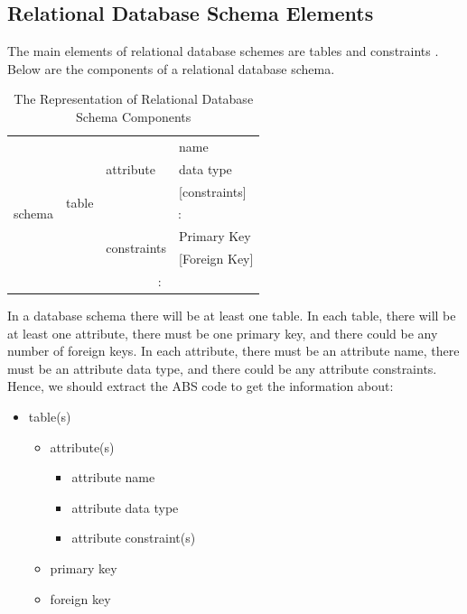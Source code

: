 \documentclass[runningheads,a4paper]{llncs}
\begin{document}
\subsection{Relational Database Schema Elements}
The main elements of relational database schemes are tables and constraints \cite{book2}. Below are the components of a relational database schema.

\begin{table}[]
	\centering
	\caption{ The Representation of Relational Database Schema Components}
	\label{my-label}
	\begin{tabular}{|l|l|l|l|}
		\hline
		\multirow{9}{*}{schema} & \multirow{7}{*}{table} & \multirow{3}{*}{attribute}   & name              \\ \cline{4-4} 
		&                        &                              & data type         \\ \cline{4-4} 
		&                        &                              & {[}constraints{]} \\ \cline{3-4} 
		&                        & \multicolumn{2}{c|}{\multirow{2}{*}{:}}          \\
		&                        & \multicolumn{2}{c|}{}                            \\ \cline{3-4} 
		&                        & \multirow{2}{*}{constraints} & Primary Key       \\ \cline{4-4} 
		&                        &                              & {[}Foreign Key{]} \\ \cline{2-4} 
		& \multicolumn{3}{c|}{\multirow{2}{*}{:}}                                   \\
		& \multicolumn{3}{c|}{}                                                     \\ \hline
	\end{tabular}
\end{table}

In a database schema there will be at least one table. In each table, there will be at least one attribute, there must be one primary key, and there could be any number of foreign keys. In each attribute, there must be an attribute name, there must be an attribute data type, and there could be any attribute constraints. Hence, we should extract the ABS code to get the information about:

\begin{itemize}
	\item table(s)
	\begin{itemize}	
		\item attribute(s)
			\begin{itemize}
				\item attribute name
				\item attribute data type
				\item attribute constraint(s)
			\end{itemize}
		\item primary key
		\item foreign key
	\end{itemize}
\end{itemize}
\end{document}
